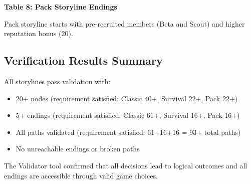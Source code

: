 \documentclass[12pt,a4paper]{article}
\begin{document}
\textbf{Table 8: Pack Storyline Endings}
\begin{center}
\end{center}

\vspace{0.3cm}

Pack storyline starts with pre-recruited members (Beta and Scout) and higher reputation bonus (20).

\subsection{Verification Results Summary}
All storylines pass validation with:
\begin{itemize}
	\item 20+ nodes (requirement satisfied: Classic 40+, Survival 22+, Pack 22+)
	\item 5+ endings (requirement satisfied: Classic 61+, Survival 16+, Pack 16+)
	\item All paths validated (requirement satisfied: 61+16+16 = 93+ total paths)
	\item No unreachable endings or broken paths
\end{itemize}

The Validator tool confirmed that all decisions lead to logical outcomes and all endings are accessible through valid game choices.
\end{document}
